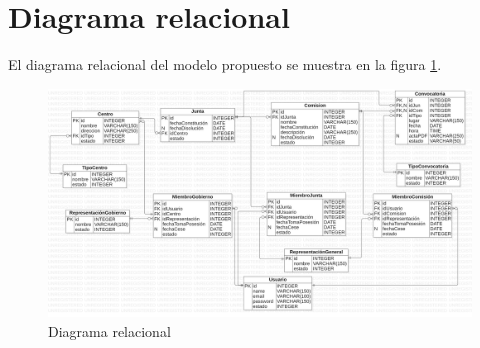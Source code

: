 \section{Diagrama relacional}\label{sec:diagrama-relacional}
El diagrama relacional del modelo propuesto se muestra en la figura \ref{fig:Diagrama Relacional}.

\begin{landscape}
\begin{figure}[H]
\centering
\includegraphics[scale=0.3]{img/diagramas/Datos/Diagrama-relacional.png}
\caption{Diagrama relacional}\label{fig:Diagrama Relacional}   
\end{figure}
\end{landscape}



